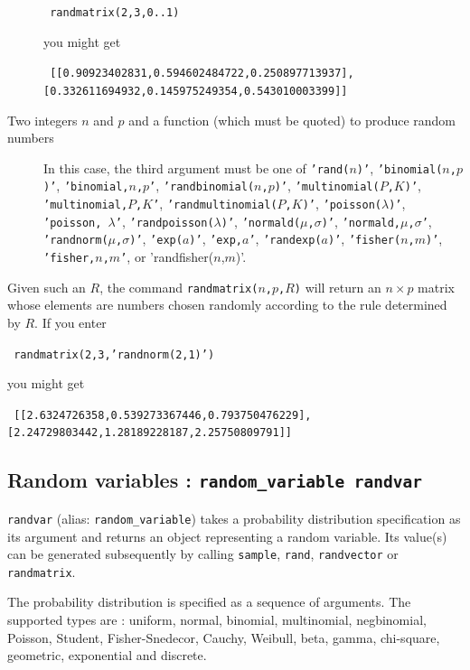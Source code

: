 \documentclass[a4paper,11pt]{book}
\begin{document}
\begin{description}
\begin{center}
  \tt
  randmatrix(2,3,0..1)
\end{center}
you might get
\begin{center}
  \tt
  [[0.90923402831,0.594602484722,0.250897713937],[0.332611694932,0.145975249354,0.543010003399]]
\end{center}
\item[Two integers $n$ and $p$ and a function (which must be quoted)
to produce random numbers] 
In this case, the third argument must be
one of \texttt{'rand($n$)'}, \texttt{'binomial($n$,$p$)'},
\texttt{'binomial,$n$,$p$'}, \texttt{'randbinomial($n$,$p$)'},
\texttt{'multinomial($P$,$K$)'}, \texttt{'multinomial,$P$,$K$'},
\texttt{'randmultinomial($P$,$K$)'}, \texttt{'poisson($\lambda$)'},
\texttt{'poisson, $\lambda$'}, \texttt{'randpoisson($\lambda$)'},
\texttt{'normald($\mu$,$\sigma$)'}, \texttt{'normald,$\mu$,$\sigma$'},
\texttt{'randnorm($\mu$,$\sigma$)'}, \texttt{'exp($a$)'},
\texttt{'exp,$a$'}, \texttt{'randexp($a$)'},
\texttt{'fisher($n$,$m$)'}, \texttt{'fisher,$n$,$m$'}, or
\textrm{'randfisher($n$,$m$)'}.
\end{description}
Given such an $R$, the command \texttt{randmatrix($n$,$p$,$R$)} will
return an $n\times p$ matrix whose elements are numbers chosen
randomly according to the rule determined by $R$.
If you enter
\begin{center}
  \tt
  randmatrix(2,3,'randnorm(2,1)')
\end{center}
you might get
\begin{center}
  \tt
  [[2.6324726358,0.539273367446,0.793750476229],[2.24729803442,1.28189228187,2.25750809791]]  
\end{center}

\subsection{Random variables : {\tt random\_variable randvar}}

{\tt randvar} (alias: {\tt random\_variable}) takes a probability distribution specification as its argument and returns an object representing a random variable. Its value(s) can be generated subsequently by calling {\tt sample}, {\tt rand}, {\tt randvector} or {\tt randmatrix}.

The probability distribution is specified as a sequence of arguments. The supported types are : uniform, normal, binomial, multinomial, negbinomial, Poisson, Student, Fisher-Snedecor, Cauchy, Weibull, beta, gamma, chi-square, geometric, exponential and discrete.
\end{document}
